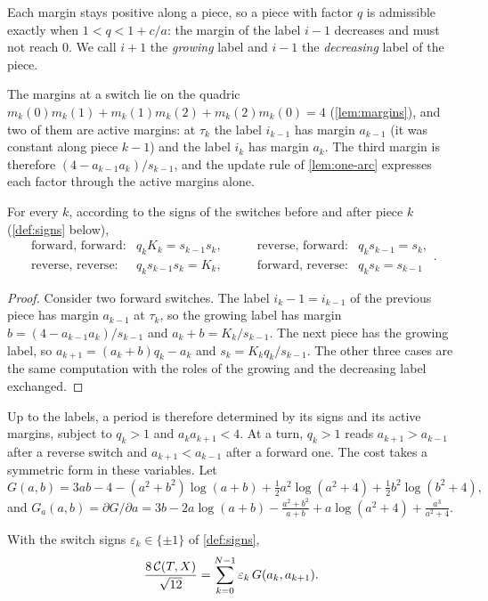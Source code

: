 Each margin stays positive along a piece, so a piece with factor $q$ is admissible exactly when
$1<q<1+c/a$: the margin of the label $i-1$ decreases and must not reach $0$. We call $i+1$ the
\emph{growing} label and $i-1$ the \emph{decreasing} label of the piece.

The margins at a switch lie on the quadric $m_k(0)m_k(1)+m_k(1)m_k(2)+m_k(2)m_k(0)=4$
(\cref{lem:margins}), and two of them are active margins: at $\tau_k$ the label $i_{k-1}$ has
margin $a_{k-1}$ (it was constant along piece $k-1$) and the label $i_k$ has margin $a_k$. The
third margin is therefore $(4-a_{k-1}a_k)/s_{k-1}$, and the update rule of \cref{lem:one-arc}
expresses each factor through the active margins alone.

\begin{lemma}\label{lem:per-factors}
For every $k$, according to the signs of the switches before and after piece $k$
(\cref{def:signs} below),
\[
  \begin{array}{llll}
    \text{forward, forward:} & q_kK_k=s_{k-1}s_k, &\qquad
    \text{reverse, forward:} & q_ks_{k-1}=s_k,\\[2pt]
    \text{reverse, reverse:} & q_ks_{k-1}s_k=K_k, &\qquad
    \text{forward, reverse:} & q_ks_k=s_{k-1}
  \end{array}.
\]
\end{lemma}

\begin{proof}
Consider two forward switches. The label $i_k-1=i_{k-1}$ of the previous piece has margin
$a_{k-1}$ at $\tau_k$, so the growing label has margin $b=(4-a_{k-1}a_k)/s_{k-1}$ and
$a_k+b=K_k/s_{k-1}$. The next piece has the growing label, so
$a_{k+1}=(a_k+b)q_k-a_k$ and $s_k=K_kq_k/s_{k-1}$. The other three cases are the same
computation with the roles of the growing and the decreasing label exchanged.
\end{proof}

Up to the labels, a period is therefore determined by its signs and its active margins, subject
to $q_k>1$ and $a_ka_{k+1}<4$. At a turn, $q_k>1$ reads $a_{k+1}>a_{k-1}$ after a reverse switch
and $a_{k+1}<a_{k-1}$ after a forward one. The cost takes a symmetric form in these variables.
Let
\[
  G(a,b)=3ab-4-(a^2+b^2)\log(a+b)+\tfrac12a^2\log(a^2+4)+\tfrac12b^2\log(b^2+4),
\]
and
$G_a(a,b)=\partial G/\partial a
=3b-2a\log(a+b)-\frac{a^2+b^2}{a+b}+a\log(a^2+4)+\frac{a^3}{a^2+4}$.

\begin{lemma}\label{lem:per-signed-action}
With the switch signs $\varepsilon_k\in\{\pm1\}$ of \cref{def:signs},
\[
  \frac{8\,\mathcal{C}(T,X)}{\sqrt{12}}=\sum_{k=0}^{N-1}\varepsilon_k\,G(a_k,a_{k+1}).
\]
\end{lemma}

